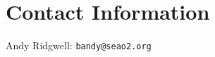\documentclass[10pt,twoside]{article}
\begin{document}

\newpage
\section{Contact Information}

\begin{compactitem}
	\item Andy Ridgwell: \texttt{bandy@seao2.org}
\end{compactitem}



\end{document}
